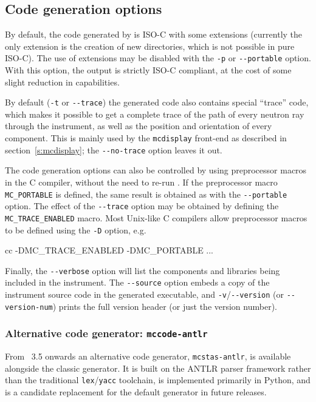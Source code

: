 \subsection{Code generation options}

By default, the code generated by \mcs is ISO-C with
some extensions (currently the only extension is the creation of new
directories, which is not possible in pure ISO-C). The use of
extensions may be disabled with the \verb+-p+ or \verb+--portable+
option. With this option, the output is strictly ISO-C compliant, at
the cost of some slight reduction in capabilities.

By default (\verb+-t+ or \verb+--trace+) the generated code also contains
special ``trace'' code, which makes it possible to get a complete trace of the
path of every neutron ray through the instrument, as well as the position
and orientation of every component. This is mainly used by the
\verb+mcdisplay+ front-end as described in section~\ref{s:mcdisplay}; the
\verb+--no-trace+ option leaves it out.

The code generation options can also be controlled by using preprocessor
macros in the C compiler, without the need to re-run \mcs.
If the preprocessor macro \verb+MC_PORTABLE+ is defined, the
same result is obtained as with the \verb+--portable+ option.
The effect of the \verb+--trace+ option may be obtained
by defining the \verb+MC_TRACE_ENABLED+ macro. Most Unix-like C
compilers allow preprocessor macros to be defined using the \verb+-D+
option, e.g.
\begin{bash}
    cc -DMC_TRACE_ENABLED -DMC_PORTABLE ...
\end{bash}
Finally, the \verb+--verbose+ option will list the components and libraries being
included in the instrument. The \verb+--source+ option embeds a copy of the
instrument source code in the generated executable, and \verb+-v+/\verb+--version+
(or \verb+--version-num+) prints the full version header (or just the version
number).

\subsubsection{Alternative code generator: \texttt{mccode-antlr}}
\label{s:antlr}

From \MCS~3.5 onwards an alternative code generator,
\texttt{mcstas-antlr}, is available alongside the classic generator.
It is built on the ANTLR parser framework rather than the traditional
\texttt{lex}/\texttt{yacc} toolchain, is implemented primarily in Python,
and is a candidate replacement for the default generator in future releases.

